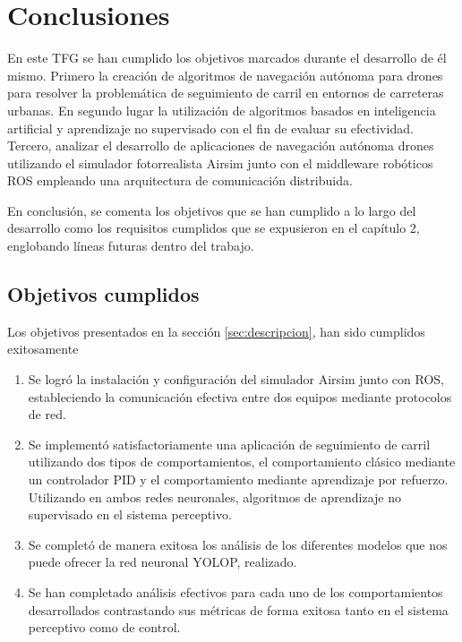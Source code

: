 \chapter{Conclusiones}
\label{cap:capitulo5}

En este TFG se han cumplido los objetivos marcados durante el desarrollo de él mismo. Primero la creación de algoritmos de
navegación autónoma para drones para resolver la problemática de seguimiento de carril en entornos de carreteras
urbanas. En segundo lugar la utilización de algoritmos basados en inteligencia artificial y aprendizaje no supervisado
con el fin de evaluar su efectividad. Tercero, analizar el desarrollo de aplicaciones de navegación autónoma drones
utilizando el simulador fotorrealista Airsim junto con el middleware robóticos ROS empleando una arquitectura de
comunicación distribuida. 

En conclusión, se comenta los objetivos que se han cumplido a lo largo del desarrollo como los requisitos cumplidos
que se expusieron en el capítulo 2, englobando líneas futuras dentro del trabajo. 

\section{Objetivos cumplidos}
\label{objetivos_cumplidos}

Los objetivos presentados en la sección \ref{sec:descripcion}, han sido cumplidos exitosamente 
\begin{enumerate}
    \item Se logró la instalación y configuración del simulador Airsim junto con ROS, estableciendo la comunicación efectiva
    entre dos equipos mediante protocolos de red. 
    \item Se implementó satisfactoriamente una aplicación de seguimiento de carril utilizando dos tipos de comportamientos,
    el comportamiento clásico mediante un controlador PID y el comportamiento mediante aprendizaje por refuerzo. Utilizando
    en ambos redes neuronales, algoritmos de aprendizaje no supervisado en el sistema perceptivo. 
    \item Se completó de manera exitosa los análisis de los diferentes modelos que nos puede ofrecer la red neuronal YOLOP,
    realizado. 
    \item Se han completado análisis efectivos para cada uno de los comportamientos desarrollados contrastando sus métricas
    de forma exitosa tanto en el sistema perceptivo como de control. 
\end{enumerate}

